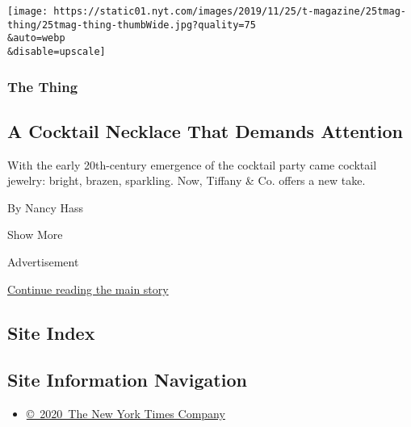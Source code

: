 \begin{enumerate}
  \texttt{[image: https://static01.nyt.com/images/2019/11/25/t-magazine/25tmag-thing/25tmag-thing-thumbWide.jpg?quality=75\\\&auto=webp\\\&disable=upscale]}

  \hypertarget{the-thing-2}{%
  \subsubsection{The Thing}\label{the-thing-2}}

  \hypertarget{a-cocktail-necklace-that-demands-attention}{%
  \subsection{A Cocktail Necklace That Demands
  Attention}\label{a-cocktail-necklace-that-demands-attention}}

  With the early 20th-century emergence of the cocktail party came
  cocktail jewelry: bright, brazen, sparkling. Now, Tiffany \& Co.
  offers a new take.

  By Nancy Hass
\end{enumerate}

Show More

Advertisement

\protect\hyperlink{after-mid2}{Continue reading the main story}

\hypertarget{site-index}{%
\subsection{Site Index}\label{site-index}}

\hypertarget{site-information-navigation}{%
\subsection{Site Information
Navigation}\label{site-information-navigation}}

\begin{itemize}
\tightlist
\item
  \href{https://help.nytimes.com/hc/en-us/articles/115014792127-Copyright-notice}{©~2020~The
  New York Times Company}
\end{itemize}

